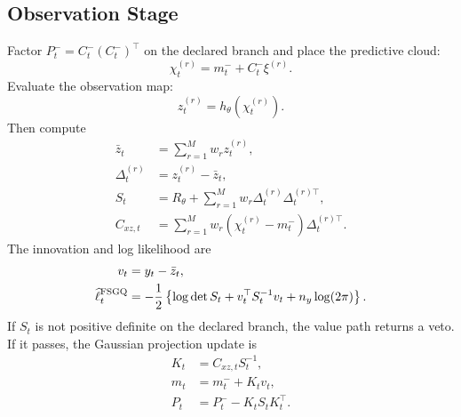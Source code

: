 \documentclass[11pt]{article}
\numberwithin{equation}{section}
\newcommand{\ellhat}{\widehat\ell}
\begin{document}
\subsection{Observation Stage}

Factor \(P_t^-=C_t^-(C_t^-)^\top\) on the declared branch and place the
predictive cloud:
\begin{equation}
  \chi_t^{(r)}
  =
  m_t^-+C_t^-\xi^{(r)}.
  \label{eq:p31-obs-placed-points}
\end{equation}
Evaluate the observation map:
\begin{equation}
  z_t^{(r)}=h_\theta(\chi_t^{(r)}).
  \label{eq:p31-obs-values}
\end{equation}
Then compute
\begin{align}
  \bar z_t&=\sum_{r=1}^Mw_rz_t^{(r)},
  \label{eq:p31-obs-mean}\\
  \Delta_t^{(r)}&=z_t^{(r)}-\bar z_t,
  \label{eq:p31-obs-centered}\\
  S_t&=R_\theta+\sum_{r=1}^Mw_r
  \Delta_t^{(r)}\Delta_t^{(r)\top},
  \label{eq:p31-obs-cov}\\
  C_{xz,t}&=\sum_{r=1}^Mw_r
  (\chi_t^{(r)}-m_t^-)\Delta_t^{(r)\top}.
  \label{eq:p31-cross-cov}
\end{align}
The innovation and log likelihood are
\begin{align}
  v_t&=y_t-\bar z_t,
  \label{eq:p31-innovation}\\
  \ellhat_t^{\rm FSGQ}
  &=
  -\frac12
  \left\{\log\det S_t+v_t^\top S_t^{-1}v_t+n_y\log(2\pi)\right\}.
  \label{eq:p31-fsgq-loglik}
\end{align}
If \(S_t\) is not positive definite on the declared branch, the value path
returns a veto.  If it passes, the Gaussian projection update is
\begin{align}
  K_t&=C_{xz,t}S_t^{-1},
  \label{eq:p31-kalman-gain}\\
  m_t&=m_t^-+K_tv_t,
  \label{eq:p31-filter-mean}\\
  P_t&=P_t^- - K_tS_tK_t^\top.
  \label{eq:p31-filter-cov}
\end{align}
\end{document}
